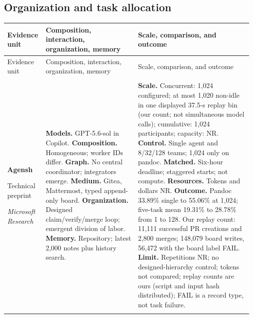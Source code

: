 \subsection{Organization and task allocation}
\begingroup
\small
\setlength{\tabcolsep}{5pt}
\renewcommand{\arraystretch}{1.13}
\begin{longtable}{@{}>{\raggedright\arraybackslash}p{}>{\raggedright\arraybackslash}p{}>{\raggedright\arraybackslash}p{}@{}}
\toprule
Evidence unit & Composition, interaction, organization, memory & Scale, comparison, and outcome \\
\midrule
\endfirsthead
\toprule
Evidence unit & Composition, interaction, organization, memory & Scale, comparison, and outcome \\
\midrule
\endhead
\midrule
\multicolumn{3}{r}{Continued on next page}\\
\endfoot
\bottomrule
\endlastfoot
\textbf{Agensh}\par \citep{agensh-1024}\par Technical preprint\par\emph{Microsoft Research} & \textbf{Models.} GPT-5.6-sol in Copilot. \textbf{Composition.} Homogeneous; worker IDs differ. \textbf{Graph.} No central coordinator; integrators emerge. \textbf{Medium.} Gitea, Mattermost, typed append-only board. \textbf{Organization.} Designed claim/verify/merge loop; emergent division of labor. \textbf{Memory.} Repository; latest 2,000 notes plus history search. & \textbf{Scale.} Concurrent: 1,024 configured; at most 1,020 non-idle in one displayed 37.5-s replay bin (our count; not simultaneous model calls); cumulative: 1,024 participants; capacity: NR. \textbf{Control.} Single agent and 8/32/128 teams; 1,024 only on pandoc. \textbf{Matched.} Six-hour deadline; staggered starts; not compute. \textbf{Resources.} Tokens and dollars NR. \textbf{Outcome.} Pandoc 33.89\% single to 55.06\% at 1,024; five-task mean 19.31\% to 28.78\% from 1 to 128. Our replay count: 11,111 successful PR creations and 2,800 merges; 148,079 board writes, 56,472 with the board label FAIL. \textbf{Limit.} Repetitions NR; no designed-hierarchy control; tokens not compared; replay counts are ours (script and input hash distributed); FAIL is a record type, not task failure. \\ \addlinespace[5pt]

\end{longtable}
